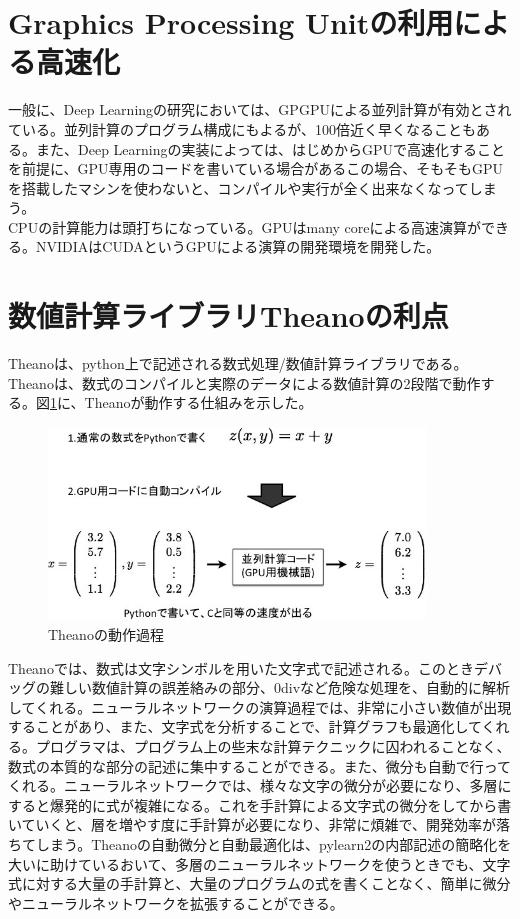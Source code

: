 \section{Graphics Processing Unitの利用による高速化}
一般に、Deep Learningの研究においては、GPGPUによる並列計算が有効とされている。並列計算のプログラム構成にもよるが、100倍近く早くなることもある。また、Deep Learningの実装によっては、はじめからGPUで高速化することを前提に、GPU専用のコードを書いている場合があるこの場合、そもそもGPUを搭載したマシンを使わないと、コンパイルや実行が全く出来なくなってしまう。\\
CPUの計算能力は頭打ちになっている。GPUはmany coreによる高速演算ができる。NVIDIAはCUDAというGPUによる演算の開発環境を開発した。
\section{数値計算ライブラリTheanoの利点}
Theanoは、python上で記述される数式処理/数値計算ライブラリである。Theanoは、数式のコンパイルと実際のデータによる数値計算の2段階で動作する\cite{bergstra+al:2010-scipy}。図\ref{c4_theano_compile}に、Theanoが動作する仕組みを示した。
\begin{figure}[tbp]
 \centering
  \includegraphics[width=100mm]{img/c4/theano_compile}
 \caption{Theanoの動作過程}
 \label{c4_theano_compile}
\end{figure}
Theanoでは、数式は文字シンボルを用いた文字式で記述される。このときデバッグの難しい数値計算の誤差絡みの部分、0divなど危険な処理を、自動的に解析してくれる。ニューラルネットワークの演算過程では、非常に小さい数値が出現することがあり、また、文字式を分析することで、計算グラフも最適化してくれる。プログラマは、プログラム上の些末な計算テクニックに囚われることなく、数式の本質的な部分の記述に集中することができる。また、微分も自動で行ってくれる。ニューラルネットワークでは、様々な文字の微分が必要になり、多層にすると爆発的に式が複雑になる。これを手計算による文字式の微分をしてから書いていくと、層を増やす度に手計算が必要になり、非常に煩雑で、開発効率が落ちてしまう。Theanoの自動微分と自動最適化は、pylearn2の内部記述の簡略化を大いに助けているおいて、多層のニューラルネットワークを使うときでも、文字式に対する大量の手計算と、大量のプログラムの式を書くことなく、簡単に微分やニューラルネットワークを拡張することができる。
